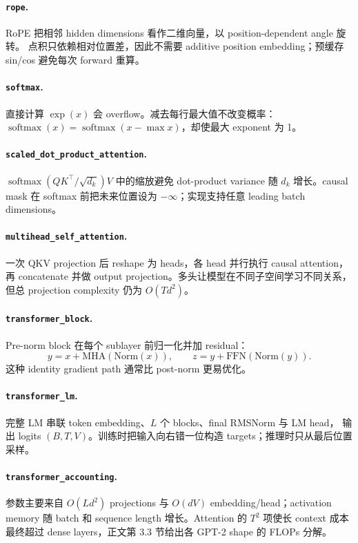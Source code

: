 \paragraph{\texttt{rope}.}
RoPE 把相邻 hidden dimensions 看作二维向量，以 position-dependent angle 旋转。
点积只依赖相对位置差，因此不需要 additive position embedding；预缓存 sin/cos
避免每次 forward 重算。

\paragraph{\texttt{softmax}.}
直接计算 $\exp(x)$ 会 overflow。减去每行最大值不改变概率：
$\operatorname{softmax}(x)=\operatorname{softmax}(x-\max x)$，却使最大 exponent 为 1。

\paragraph{\texttt{scaled\_dot\_product\_attention}.}
$\operatorname{softmax}(QK^\top/\sqrt{d_k})V$ 中的缩放避免 dot-product variance 随
$d_k$ 增长。causal mask 在 softmax 前把未来位置设为 $-\infty$；实现支持任意 leading
batch dimensions。

\paragraph{\texttt{multihead\_self\_attention}.}
一次 QKV projection 后 reshape 为 heads，各 head 并行执行 causal attention，
再 concatenate 并做 output projection。多头让模型在不同子空间学习不同关系，
但总 projection complexity 仍为 $O(Td^2)$。

\paragraph{\texttt{transformer\_block}.}
Pre-norm block 在每个 sublayer 前归一化并加 residual：
\[
y=x+\mathrm{MHA}(\mathrm{Norm}(x)),\qquad
z=y+\mathrm{FFN}(\mathrm{Norm}(y)).
\]
这种 identity gradient path 通常比 post-norm
更易优化。

\paragraph{\texttt{transformer\_lm}.}
完整 LM 串联 token embedding、$L$ 个 blocks、final RMSNorm 与 LM head，
输出 logits $(B,T,V)$。训练时把输入向右错一位构造 targets；推理时只从最后位置采样。

\paragraph{\texttt{transformer\_accounting}.}
参数主要来自 $O(Ld^2)$ projections 与 $O(dV)$ embedding/head；activation memory
随 batch 和 sequence length 增长。Attention 的 $T^2$ 项使长 context 成本最终超过
dense layers，正文第 3.3 节给出各 GPT-2 shape 的 FLOPs 分解。

